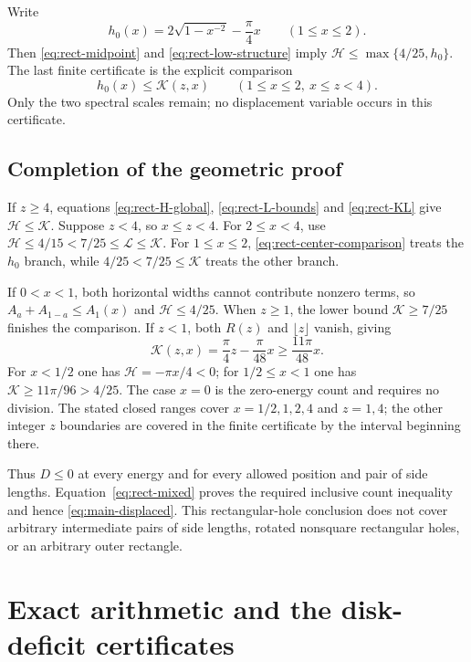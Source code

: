 \documentclass[11pt,reqno]{amsart}
\numberwithin{equation}{section}
\begin{document}
Write
\[
 h_0(x)=2\sqrt{1-x^{-2}}-\frac\pi4x\qquad(1\le x\le2).
\]
Then \eqref{eq:rect-midpoint} and
\eqref{eq:rect-low-structure} imply
$\mathcal H\le\max\{4/25,h_0\}$. The last finite
certificate is the explicit comparison
\begin{equation}\label{eq:rect-center-comparison}
 h_0(x)\le\mathcal K(z,x)
 \qquad(1\le x\le2,\ x\le z<4).
\end{equation}
Only the two spectral scales remain; no displacement variable
occurs in this certificate.

\subsection*{Completion of the geometric proof}

If $z\ge4$, equations \eqref{eq:rect-H-global},
\eqref{eq:rect-L-bounds} and \eqref{eq:rect-KL} give
$\mathcal H\le\mathcal K$. Suppose $z<4$, so $x\le z<4$.
For $2\le x<4$, use $\mathcal H\le4/15<7/25\le
\mathcal L\le\mathcal K$. For $1\le x\le2$,
\eqref{eq:rect-center-comparison} treats the $h_0$ branch,
while $4/25<7/25\le\mathcal K$ treats the other branch.

If $0<x<1$, both horizontal widths cannot contribute nonzero
terms, so $A_a+A_{1-a}\le A_1(x)$ and
$\mathcal H\le4/25$. When $z\ge1$, the lower bound
$\mathcal K\ge7/25$ finishes the comparison. If $z<1$,
both $R(z)$ and $\lfloor z\rfloor$ vanish, giving
\[
 \mathcal K(z,x)=\frac\pi4z-\frac\pi{48}x
 \ge\frac{11\pi}{48}x.
\]
For $x<1/2$ one has $\mathcal H=-\pi x/4<0$; for
$1/2\le x<1$ one has $\mathcal K\ge11\pi/96>4/25$.
The case $x=0$ is the zero-energy count and requires no division.
The stated closed ranges cover $x=1/2,1,2,4$ and $z=1,4$;
the other integer $z$ boundaries are covered in the finite
certificate by the interval beginning there.

Thus $D\le0$ at every energy and for every allowed position
and pair of side lengths. Equation~\eqref{eq:rect-mixed}
proves the required inclusive count inequality and hence
\eqref{eq:main-displaced}. This rectangular-hole conclusion does not cover
arbitrary intermediate pairs of side lengths,
rotated nonsquare rectangular holes, or an arbitrary outer rectangle.

\appendix

\section{Exact arithmetic and the disk-deficit certificates}\label{app:certificate}
\end{document}
